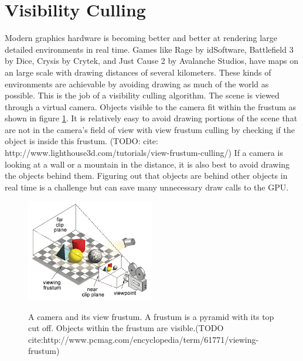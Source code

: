 \documentclass[12pt]{ucthesis}
\newcommand{\captionfonts}{\small\bf\ssp}
\begin{document}
\section{Visibility Culling}
\label{visibility-culling}

Modern graphics hardware is becoming better and better at rendering large detailed environments in real time.
Games like Rage by idSoftware, Battlefield 3 by Dice, Crysis by Crytek, and Just Cause 2 by Avalanche Studios, have maps on an large scale with drawing distances of several kilometers.
These kinds of environments are achievable by avoiding drawing as much of the world as possible.\cite{heir-occ-map, large-occluders, Vis-Computations-Densely-Occluded, Portal-culling, Cryengine-culling-explained, Portals-mirrors, dpvs, cryengine3, culling-bf, CHC, CHCpp}
This is the job of a visibility culling algorithm.
The scene is viewed through a virtual camera.
Objects visible to the camera fit within the frustum as shown in figure \ref{fig:frustum}.
It is relatively easy to avoid drawing portions of the scene that are not in the camera's field of view with view frustum culling by checking if the object is inside this frustum.
(TODO: cite: http://www.lighthouse3d.com/tutorials/view-frustum-culling/)
If a camera is looking at a wall or a mountain in the distance, it is also best to avoid drawing the objects behind them.
Figuring out that objects are behind other objects in real time is a challenge but can save many unnecessary draw calls to the GPU.

\begin{figure}
\begin{center}
\includegraphics[width=0.5\textwidth]{Images/frustum.png}
\captionfonts
\caption[View Frustum]{A camera and its view frustum. A frustum is a pyramid with its top cut off. Objects within the frustum are visible.(TODO cite:http://www.pcmag.com/encyclopedia/term/61771/viewing-frustum)}
\label{fig:frustum}
\end{center}
\end{figure}
\end{document}
